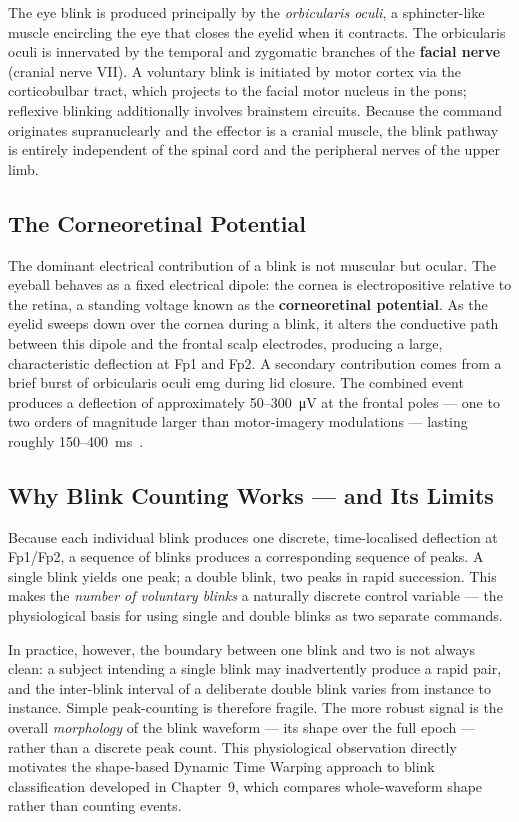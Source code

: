 The eye blink is produced principally by the \textit{orbicularis
oculi}, a sphincter-like muscle encircling the eye that closes the
eyelid when it contracts. The orbicularis oculi is innervated by the
temporal and zygomatic branches of the \textbf{facial nerve} (cranial
nerve VII). A voluntary blink is initiated by motor cortex via the
corticobulbar tract, which projects to the facial motor nucleus in
the pons; reflexive blinking additionally involves brainstem circuits.
Because the command originates supranuclearly and the effector is a
cranial muscle, the blink pathway is entirely independent of the
spinal cord and the peripheral nerves of the upper limb.

\subsection{The Corneoretinal Potential}

The dominant electrical contribution of a blink is not muscular but
ocular. The eyeball behaves as a fixed electrical dipole: the cornea
is electropositive relative to the retina, a standing voltage known
as the \textbf{corneoretinal potential}. As the eyelid sweeps down
over the cornea during a blink, it alters the conductive path between
this dipole and the frontal scalp electrodes, producing a large,
characteristic deflection at Fp1 and Fp2. A secondary contribution
comes from a brief burst of orbicularis oculi \acrshort{emg} during
lid closure. The combined event produces a deflection of approximately
50--\SI{300}{\micro\volt} at the frontal poles --- one to two orders
of magnitude larger than motor-imagery modulations --- lasting
roughly 150--\SI{400}{\milli\second}~\cite{croft2000removal,
usakli2010mouse}.

\subsection{Why Blink Counting Works --- and Its Limits}

Because each individual blink produces one discrete, time-localised
deflection at Fp1/Fp2, a sequence of blinks produces a corresponding
sequence of peaks. A single blink yields one peak; a double blink, two
peaks in rapid succession. This makes the \emph{number of voluntary
blinks} a naturally discrete control variable --- the physiological
basis for using single and double blinks as two separate commands.

In practice, however, the boundary between one blink and two is not
always clean: a subject intending a single blink may inadvertently
produce a rapid pair, and the inter-blink interval of a deliberate
double blink varies from instance to instance. Simple peak-counting is
therefore fragile. The more robust signal is the overall
\emph{morphology} of the blink waveform --- its shape over the full
epoch --- rather than a discrete peak count. This physiological
observation directly motivates the shape-based Dynamic Time Warping
approach to blink classification developed in Chapter~9, which compares
whole-waveform shape rather than counting events.

